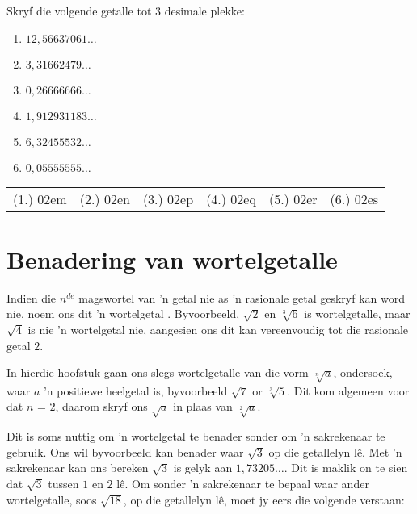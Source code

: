 \begin{exercises}{}
{
Skryf die volgende getalle tot $3$ desimale plekke:
\begin{enumerate}[itemsep=5pt, label=\textbf{\arabic*}. ]
\item $12,56637061\ldots$ %
\item $3,31662479\ldots$ %
\item $0,26666666\ldots$ %
\item $1,912931183\ldots$ %
\item $6,32455532\ldots$ %
\item $0,05555555\ldots$ %
\end{enumerate}

\par \practiceinfo
\par \begin{tabular}[h]{cccccc}
(1.)	02em	&
(2.)	02en	&
(3.)	02ep	&
(4.)	02eq	&
(5.)	02er	&
(6.)	02es	\\ %
\end{tabular}
}
\end{exercises}


\section{Benadering van wortelgetalle}

Indien die $n^{de}$ magswortel van ’n getal nie as ’n rasionale getal geskryf kan word nie,  noem ons dit ’n wortelgetal . Byvoorbeeld, $\sqrt{2}$ en $\sqrt[3]{6}$ is wortelgetalle, maar $\sqrt{4}$ is nie ’n wortelgetal nie, aangesien ons dit kan vereenvoudig tot die rasionale getal $2$.\par 
In hierdie hoofstuk gaan ons slegs wortelgetalle van die vorm $\sqrt[n]{a}$, ondersoek, waar  $a$ ’n positiewe heelgetal is, byvoorbeeld $\sqrt{7}$ or $\sqrt[3]{5}$. Dit kom algemeen voor dat $n$ = $2$, daarom skryf ons $\sqrt{a}$ in plaas van $\sqrt[2]{a}$.\par 
Dit is soms nuttig om ’n wortelgetal te benader sonder om ’n sakrekenaar te gebruik. Ons wil byvoorbeeld kan benader waar $\sqrt{3}$ op die getallelyn lê. Met ’n sakrekenaar kan ons bereken $\sqrt{3}$ is gelyk aan $1,73205\ldots$. Dit is maklik on te sien dat $\sqrt{3}$ tussen $1$ en $2$ lê. Om sonder ’n sakrekenaar te bepaal waar ander wortelgetalle, soos $\sqrt{18}$, op die getallelyn lê, moet jy eers die volgende verstaan:\par 


